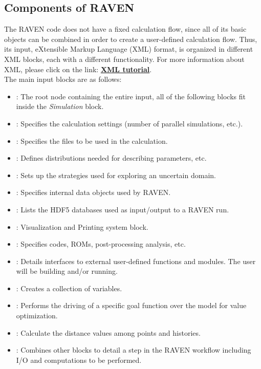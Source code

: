 \subsection{Components of RAVEN}
\label{sub:InputComponents}
The RAVEN code does not have a fixed calculation flow, since all of its basic
objects can be combined in order to create a user-defined calculation flow.
%
Thus, its input, eXtensible Markup Language (XML) format, is organized in different XML blocks, each with a
different functionality. For more information about XML, please click on the link:
\href{https://www.w3schools.com/xml/default.asp}{\textbf{XML tutorial}}.
%
\\The main input blocks are as follows:
\begin{itemize}
  \item {}: The root node containing the
  entire input, all of
  the following blocks fit inside the \emph{Simulation} block.
  \item {}: Specifies the calculation
  settings (number of parallel simulations, etc.).
  \item {}: Specifies the files to be
  used in the calculation.
  \item {}: Defines distributions
  needed for describing parameters, etc.
  \item {}: Sets up the strategies used for
  exploring an uncertain domain.
  \item {}: Specifies internal data objects
  used by RAVEN.
  \item {}: Lists the HDF5 databases used
  as input/output to a
  RAVEN run.
  \item {}: Visualization and
  Printing system block.
  \item {}: Specifies codes, ROMs,
  post-processing analysis, etc.
  \item {}: Details interfaces to external
  user-defined functions and modules. The user will be building and/or running.
  \item {}: Creates a collection of variables.
  \item {}: Performs the driving of a specific goal function over
  the model for value optimization.
  \item {}: Calculate the distance values among points and histories.
  \item {}: Combines other blocks to detail a
  step in the RAVEN workflow including I/O and computations to be performed.
\end{itemize}

